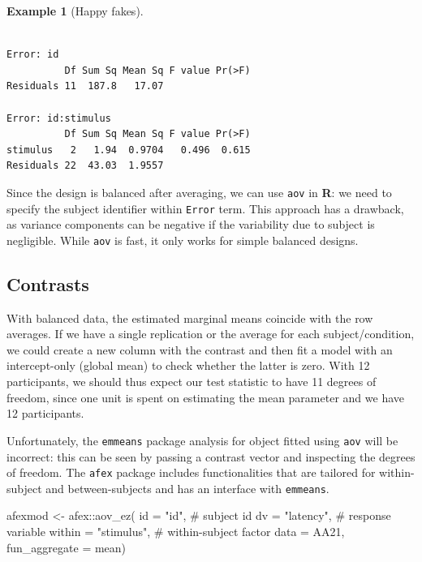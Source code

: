 \documentclass[
  11pt,
  letterpaper,
]{scrbook}
\newenvironment{Shaded}{\begin{snugshade}}{\end{snugshade}}
\newcommand{\AttributeTok}[1]{\textcolor[rgb]{0.40,0.45,0.13}{#1}}
\newcommand{\CommentTok}[1]{\textcolor[rgb]{0.37,0.37,0.37}{#1}}
\newcommand{\FunctionTok}[1]{\textcolor[rgb]{0.28,0.35,0.67}{#1}}
\newcommand{\NormalTok}[1]{\textcolor[rgb]{0.00,0.23,0.31}{#1}}
\newcommand{\OtherTok}[1]{\textcolor[rgb]{0.00,0.23,0.31}{#1}}
\newcommand{\SpecialCharTok}[1]{\textcolor[rgb]{0.37,0.37,0.37}{#1}}
\newcommand{\StringTok}[1]{\textcolor[rgb]{0.13,0.47,0.30}{#1}}
\theoremstyle{definition}
\newtheorem{example}{Example}[chapter]
\theoremstyle{remark}
\begin{document}
\begin{example}[Happy
fakes]
\begin{verbatim}

Error: id
          Df Sum Sq Mean Sq F value Pr(>F)
Residuals 11  187.8   17.07               

Error: id:stimulus
          Df Sum Sq Mean Sq F value Pr(>F)
stimulus   2   1.94  0.9704   0.496  0.615
Residuals 22  43.03  1.9557               
\end{verbatim}

Since the design is balanced after averaging, we can use \texttt{aov} in
\textbf{R}: we need to specify the subject identifier within
\texttt{Error} term. This approach has a drawback, as variance
components can be negative if the variability due to subject is
negligible. While \texttt{aov} is fast, it only works for simple
balanced designs.

\end{example}

\hypertarget{contrasts-1}{%
\subsection{Contrasts}\label{contrasts-1}}

With balanced data, the estimated marginal means coincide with the row
averages. If we have a single replication or the average for each
subject/condition, we could create a new column with the contrast and
then fit a model with an intercept-only (global mean) to check whether
the latter is zero. With 12 participants, we should thus expect our test
statistic to have 11 degrees of freedom, since one unit is spent on
estimating the mean parameter and we have 12 participants.

Unfortunately, the \texttt{emmeans} package analysis for object fitted
using \texttt{aov} will be incorrect: this can be seen by passing a
contrast vector and inspecting the degrees of freedom. The \texttt{afex}
package includes functionalities that are tailored for within-subject
and between-subjects and has an interface with \texttt{emmeans}.

\begin{Shaded}
\begin{Highlighting}[]
\NormalTok{afexmod }\OtherTok{\textless{}{-}}\NormalTok{ afex}\SpecialCharTok{::}\FunctionTok{aov\_ez}\NormalTok{(}
  \AttributeTok{id =} \StringTok{"id"}\NormalTok{,           }\CommentTok{\# subject id}
  \AttributeTok{dv =} \StringTok{"latency"}\NormalTok{,      }\CommentTok{\# response variable}
  \AttributeTok{within =} \StringTok{"stimulus"}\NormalTok{, }\CommentTok{\# within{-}subject factor}
  \AttributeTok{data =}\NormalTok{ AA21,}
  \AttributeTok{fun\_aggregate =}\NormalTok{ mean)}
\end{Highlighting}
\end{Shaded}
\end{document}
